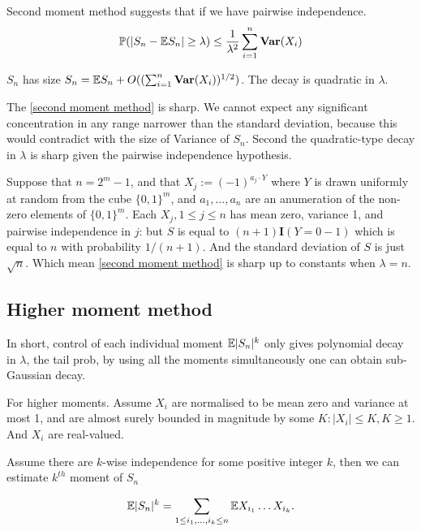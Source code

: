 Second moment method suggests that if we have pairwise independence.
\begin{equation}\label{second moment method}
    \mathbb{P}(|S_n - \mathbb{E} S_n|\geq \lambda) \leq \frac{1}{\lambda^2} \sum_{i=1}^n \mathbf{Var} (X_i)
\end{equation}

$S_n$ has size $S_n = \mathbb{E} S_n + O((\sum_{i=1}^n \mathbf{Var}(X_i))^{1/2})$. The decay is quadratic in $\lambda$.

The \ref{second moment method} is sharp. We cannot expect any significant concentration in any range narrower than the standard deviation, because this would contradict with the size of Variance of $S_n$. 
Second the quadratic-type decay in $\lambda$ is sharp given the pairwise independence hypothesis. 
\begin{example}
    Suppose that $n=2^m -1$, and that $X_j := (-1)^{a_j\cdot Y}$ where $Y$ is drawn uniformly at random from the cube $\{0,1\}^m$, and $a_1,\dots,a_n$ are an anumeration of the non-zero elements of $\{0,1\}^m$.
    Each $X_j,1\leq j \leq n$  has mean zero, variance 1, and pairwise independence in $j$: but $S$ is equal to $(n+1)\mathbf I(Y=0-1)$ which is equal to $n$ with probability $1/(n+1)$. And the standard deviation of $S$ is just $\sqrt{n}$.
    Which mean \ref{second moment method} is sharp up to constants when $\lambda=n$.
\end{example}

\subsection{Higher moment method}

\begin{remark}
    In short, control of each individual moment $\mathbb{E} |S_n|^k$ only gives polynomial decay in $\lambda$, the tail prob, by using all the moments simultaneously one can obtain sub-Gaussian decay.
\end{remark}

For higher moments. Assume $X_i$ are normalised to be mean zero and variance at most 1, and are almost surely bounded in magnitude by some $K:|X_i|\leq K,K\geq 1$. And $X_i$ are real-valued.

Assume there are $k$-wise independence for some positive integer $k$, then we can estimate $k^{th}$ moment of $S_n$

\begin{equation*}
    \mathbb{E} |S_n|^k = \sum_{1\leq i_1 ,\dots , i_k \leq n} \mathbb{E} X_{i_1}\dots X_{i_k}.
\end{equation*}

